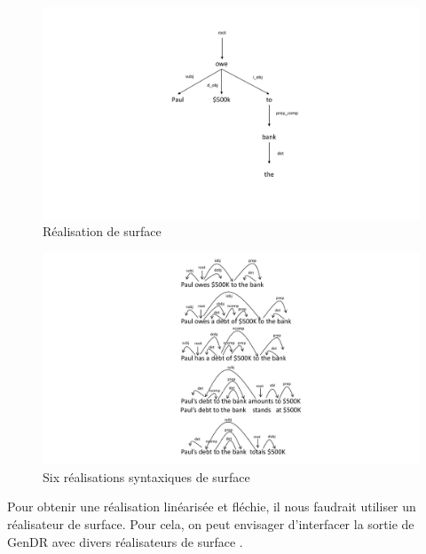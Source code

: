 \begin{figure}[htb]
	\centering
	\includegraphics[width=1\textwidth, trim = {0cm 3.5cm 3cm 2.2cm},clip]{ch3/figs/realsurfex.pdf}
	\caption{Réalisation de surface}
	\label{fig:realsurfex}
\end{figure} 

\begin{figure}[htb]
	\centering
	\includegraphics[width=1.1\textwidth, trim = {6cm 0cm 0cm 0cm},clip]{ch3/figs/6_real_surface.pdf}
	\caption{Six réalisations syntaxiques de surface \citep{lareau18}}
	\label{fig:6realsurf}
\end{figure}

Pour obtenir une réalisation linéarisée et fléchie, il nous faudrait utiliser un réalisateur de surface. Pour cela, on peut envisager d'interfacer la sortie de GenDR avec divers réalisateurs de surface \citep{DaoustJSREALTextRealizer2015, DBLP:conf/enlg/MolinsL15, GattSimpleNLGRealisationEngine2009, BelzFirstSurfaceRealisation2011}.


